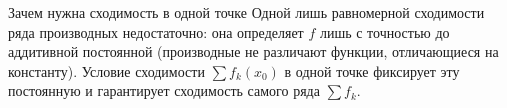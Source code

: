 \begin{Remark}{Зачем нужна сходимость в одной точке}{}
	Одной лишь равномерной сходимости ряда производных недостаточно: она определяет $f$ лишь с точностью до аддитивной постоянной (производные не различают функции, отличающиеся на константу). Условие сходимости $\sum f_k(x_0)$ в одной точке фиксирует эту постоянную и гарантирует сходимость самого ряда $\sum f_k$.
\end{Remark}
